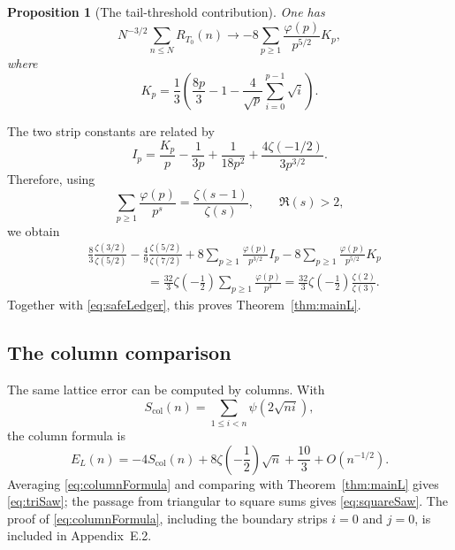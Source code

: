 \documentclass[a4paper,american,11pt]{amsart}
\theoremstyle{plain}
\newtheorem{proposition}[theorem]{Proposition}
\theoremstyle{definition}
\begin{document}
\begin{proposition}[The tail-threshold contribution]\label{prop:RT0}
One has
\begin{equation}\label{eq:RT0limit}
N^{-3/2}\sum_{n\le N}R_{T_0}(n)
\longrightarrow
-8\sum_{p\ge1}\frac{\varphi(p)}{p^{5/2}}K_p,
\end{equation}
where
\begin{equation}\label{eq:Kpdef}
K_p
=
\frac13
\left(
\frac{8p}{3}-1-\frac4{\sqrt p}\sum_{i=0}^{p-1}\sqrt i
\right).
\end{equation}
\end{proposition}

The two strip constants are related by
\begin{equation}\label{eq:IpKp}
I_p
=
\frac{K_p}{p}
-\frac{1}{3p}
+\frac{1}{18p^2}
+\frac{4\zeta(-1/2)}{3p^{3/2}}.
\end{equation}
Therefore, using
\begin{equation}\label{eq:phis}
\sum_{p\ge1}\frac{\varphi(p)}{p^s}
=
\frac{\zeta(s-1)}{\zeta(s)},
\qquad
\Re(s)>2,
\end{equation}
we obtain
\begin{align*}
&\frac83\frac{\zeta(3/2)}{\zeta(5/2)}
-\frac49\frac{\zeta(5/2)}{\zeta(7/2)}
+8\sum_{p\ge1}\frac{\varphi(p)}{p^{3/2}}I_p
-8\sum_{p\ge1}\frac{\varphi(p)}{p^{5/2}}K_p \\
&\hspace{2cm}
=
\frac{32}{3}\zeta\!\left(-\frac12\right)
\sum_{p\ge1}\frac{\varphi(p)}{p^3}
=
\frac{32}{3}\zeta\!\left(-\frac12\right)
\frac{\zeta(2)}{\zeta(3)}.
\end{align*}
Together with \eqref{eq:safeLedger}, this proves Theorem~\ref{thm:mainL}.

\subsection{The column comparison}

The same lattice error can be computed by columns. With
\begin{equation}\label{eq:Scoldef}
S_{\mathrm{col}}(n)
=
\sum_{1\le i<n}\psi(2\sqrt{ni}),
\end{equation}
the column formula is
\begin{equation}\label{eq:columnFormula}
E_L(n)
=
-4S_{\mathrm{col}}(n)
+
8\zeta\!\left(-\frac12\right)\sqrt n
+
\frac{10}{3}
+
O(n^{-1/2}).
\end{equation}
Averaging \eqref{eq:columnFormula} and comparing with
Theorem~\ref{thm:mainL} gives \eqref{eq:triSaw}; the passage from triangular
to square sums gives \eqref{eq:squareSaw}. The proof of
\eqref{eq:columnFormula}, including the boundary strips \(i=0\) and \(j=0\),
is included in Appendix~E.2.
\end{document}
